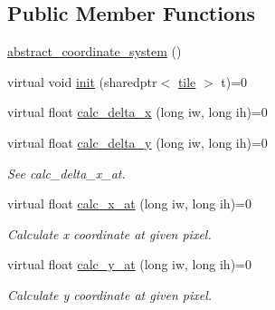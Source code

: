 \subsection*{Public Member Functions}
\begin{DoxyCompactItemize}
\item 
\hyperlink{classabstract__coordinate__system_ad6d5ae04c40f9c77a0aba70f4a7cb45e}{abstract\-\_\-coordinate\-\_\-system} ()
\item 
virtual void \hyperlink{classabstract__coordinate__system_a646c34b26579fa6f27ce00dcd8ab5951}{init} (sharedptr$<$ \hyperlink{classtile}{tile} $>$ t)=0
\item 
virtual float \hyperlink{classabstract__coordinate__system_a7df5507f5b2fddc0eb691e79514accab}{calc\-\_\-delta\-\_\-x} (long iw, long ih)=0
\item 
\hypertarget{classabstract__coordinate__system_a1129e984304df9036d3fcf548609ae08}{virtual float \hyperlink{classabstract__coordinate__system_a1129e984304df9036d3fcf548609ae08}{calc\-\_\-delta\-\_\-y} (long iw, long ih)=0}\label{classabstract__coordinate__system_a1129e984304df9036d3fcf548609ae08}

\begin{DoxyCompactList}\small\item\em See calc\-\_\-delta\-\_\-x\-\_\-at. \end{DoxyCompactList}\item 
\hypertarget{classabstract__coordinate__system_a09c21984f739869471dd2948b62b3191}{virtual float \hyperlink{classabstract__coordinate__system_a09c21984f739869471dd2948b62b3191}{calc\-\_\-x\-\_\-at} (long iw, long ih)=0}\label{classabstract__coordinate__system_a09c21984f739869471dd2948b62b3191}

\begin{DoxyCompactList}\small\item\em Calculate x coordinate at given pixel. \end{DoxyCompactList}\item 
\hypertarget{classabstract__coordinate__system_a2092dadc2aecf887bc8ca41d1fa65042}{virtual float \hyperlink{classabstract__coordinate__system_a2092dadc2aecf887bc8ca41d1fa65042}{calc\-\_\-y\-\_\-at} (long iw, long ih)=0}\label{classabstract__coordinate__system_a2092dadc2aecf887bc8ca41d1fa65042}

\begin{DoxyCompactList}\small\item\em Calculate y coordinate at given pixel. \end{DoxyCompactList}\end{DoxyCompactItemize}


